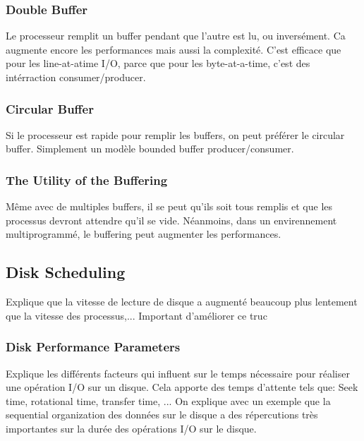 \subsubsection{Double Buffer}
Le processeur remplit un buffer pendant que l’autre est lu, ou inversément. Ca augmente encore les performances mais aussi la complexité. C’est efficace que pour les line-at-atime I/O, parce que pour les byte-at-a-time, c’est des intérraction consumer/producer.


\subsubsection{Circular Buffer}
Si le processeur est rapide pour remplir les buffers, on peut préférer le circular buffer. Simplement un modèle bounded buffer producer/consumer.
\subsubsection{The Utility of the Buffering}
Même avec de multiples buffers, il se peut qu’ils soit tous remplis et que les processus devront attendre qu’il se vide. Néanmoins, dans un envirennement multiprogrammé, le buffering peut augmenter les performances.
\subsection{Disk Scheduling}
Explique que la vitesse de lecture de disque a augmenté beaucoup plus lentement que la vitesse des processus,... Important d’améliorer ce truc
\subsubsection{Disk Performance Parameters}
Explique les différents facteurs qui influent sur le temps nécessaire pour réaliser une opération I/O sur un disque. Cela apporte des temps d’attente tels que: Seek time, rotational time, transfer time, ... On explique avec un exemple que la sequential organization des données sur le disque a des répercutions très importantes sur la durée des opérations I/O sur le disque.
